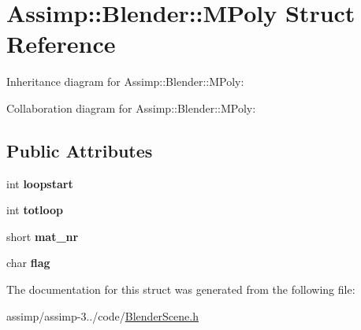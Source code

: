 \hypertarget{struct_assimp_1_1_blender_1_1_m_poly}{\section{Assimp\+:\+:Blender\+:\+:M\+Poly Struct Reference}
\label{struct_assimp_1_1_blender_1_1_m_poly}
}


Inheritance diagram for Assimp\+:\+:Blender\+:\+:M\+Poly\+:


Collaboration diagram for Assimp\+:\+:Blender\+:\+:M\+Poly\+:
\subsection*{Public Attributes}
\begin{DoxyCompactItemize}
\item 
\hypertarget{struct_assimp_1_1_blender_1_1_m_poly_a136eb4d7db9ec3b30639e846ab2701b9}{int {\bfseries loopstart}}\label{struct_assimp_1_1_blender_1_1_m_poly_a136eb4d7db9ec3b30639e846ab2701b9}

\item 
\hypertarget{struct_assimp_1_1_blender_1_1_m_poly_ad2eb5b2333f37669b21c4286e7898d35}{int {\bfseries totloop}}\label{struct_assimp_1_1_blender_1_1_m_poly_ad2eb5b2333f37669b21c4286e7898d35}

\item 
\hypertarget{struct_assimp_1_1_blender_1_1_m_poly_aa2ad78ae8a119a5090d3e547a5bc3e9f}{short {\bfseries mat\+\_\+nr}}\label{struct_assimp_1_1_blender_1_1_m_poly_aa2ad78ae8a119a5090d3e547a5bc3e9f}

\item 
\hypertarget{struct_assimp_1_1_blender_1_1_m_poly_afe075d0333433d5a227099603ada0323}{char {\bfseries flag}}\label{struct_assimp_1_1_blender_1_1_m_poly_afe075d0333433d5a227099603ada0323}

\end{DoxyCompactItemize}


The documentation for this struct was generated from the following file\+:\begin{DoxyCompactItemize}
\item 
assimp/assimp-\/3../code/\hyperlink{_blender_scene_8h}{Blender\+Scene.\+h}\end{DoxyCompactItemize}
